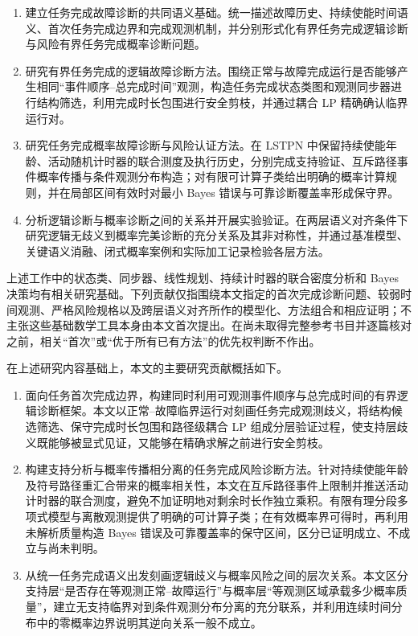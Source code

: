 \documentclass[master,fontset=ubuntu]{shnuthesis}
\theoremstyle{definition}
\begin{document}
\begin{enumerate}
  \item 建立任务完成故障诊断的共同语义基础。统一描述故障历史、持续使能时间语义、首次任务完成边界和完成观测机制，并分别形式化有界任务完成逻辑诊断与风险有界任务完成概率诊断问题。

  \item 研究有界任务完成的逻辑故障诊断方法。围绕正常与故障完成运行是否能够产生相同“事件顺序--总完成时间”观测，构造任务完成状态类图和观测同步器进行结构筛选，利用完成时长包围进行安全剪枝，并通过耦合 LP 精确确认临界运行对。

  \item 研究任务完成概率故障诊断与风险认证方法。在 LSTPN 中保留持续使能年龄、活动随机计时器的联合测度及执行历史，分别完成支持验证、互斥路径事件概率传播与条件观测分布构造；对有限可计算子类给出明确的概率计算规则，并在局部区间有效时对最小 Bayes 错误与可靠诊断覆盖率形成保守界。

  \item 分析逻辑诊断与概率诊断之间的关系并开展实验验证。在两层语义对齐条件下研究逻辑无歧义到概率完美诊断的充分关系及其非对称性，并通过基准模型、关键语义消融、闭式概率案例和实际加工记录检验各层方法。
\end{enumerate}

上述工作中的状态类、同步器、线性规划、持续计时器的联合密度分析和 Bayes 决策均有相关研究基础\cite{Basile2017,Carnevali2009,Vicario2009,Lefebvre2023,Chow1970,Blackwell1953}。下列贡献仅指围绕本文指定的首次完成诊断问题、较弱时间观测、严格风险规格以及跨层语义对齐所作的模型化、方法组合和相应证明；不主张这些基础数学工具本身由本文首次提出。在尚未取得完整参考书目并逐篇核对之前，相关“首次”或“优于所有已有方法”的优先权判断不作出。

在上述研究内容基础上，本文的主要研究贡献概括如下。

\begin{enumerate}
  \item 面向任务首次完成边界，构建同时利用可观测事件顺序与总完成时间的有界逻辑诊断框架。本文以正常--故障临界运行对刻画任务完成观测歧义，将结构候选筛选、保守完成时长包围和路径级耦合 LP 组成分层验证过程，使支持层歧义既能够被显式见证，又能够在精确求解之前进行安全剪枝。

  \item 构建支持分析与概率传播相分离的任务完成风险诊断方法。针对持续使能年龄及符号路径重汇合带来的概率相关性，本文在互斥路径事件上限制并推送活动计时器的联合测度，避免不加证明地对剩余时长作独立乘积。有限有理分段多项式模型与离散观测提供了明确的可计算子类；在有效概率界可得时，再利用未解析质量构造 Bayes 错误及可靠覆盖率的保守区间，区分已证明成立、不成立与尚未判明。

  \item 从统一任务完成语义出发刻画逻辑歧义与概率风险之间的层次关系。本文区分支持层“是否存在等观测正常--故障运行”与概率层“等观测区域承载多少概率质量”，建立无支持临界对到条件观测分布分离的充分联系，并利用连续时间分布中的零概率边界说明其逆向关系一般不成立。
\end{enumerate}
\end{document}
